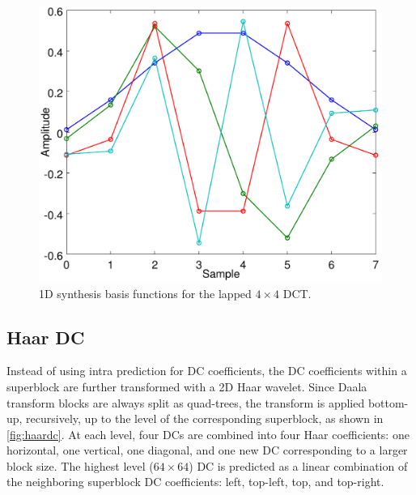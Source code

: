 \documentclass[english,conference,10pt]{IEEEtran}
\begin{document}
\begin{figure}
\centering
\includegraphics[width=0.8\columnwidth]{basis4}
\caption{1D synthesis basis functions for the lapped $4 \times 4$ DCT.\label{fig:basis4}}

\end{figure}

\subsection{Haar DC}

Instead of using intra prediction for DC coefficients, the DC coefficients
within a superblock are further transformed with a 2D Haar wavelet.
Since Daala transform blocks are always split as quad-trees, the transform is
applied bottom-up, recursively, up to the level of the corresponding superblock,
as shown in \cref{fig:haardc}.
At each level, four DCs are combined into four Haar coefficients: one horizontal,
one vertical, one diagonal, and one new DC corresponding to a larger block size.
The highest level ($64\times 64$) DC is predicted as a linear combination of the
neighboring superblock DC coefficients: left, top-left, top, and top-right.
\end{document}
